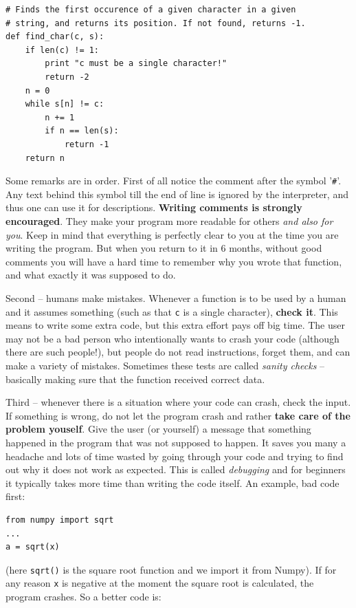 \begin{verbatim}
# Finds the first occurence of a given character in a given 
# string, and returns its position. If not found, returns -1. 
def find_char(c, s):
    if len(c) != 1: 
        print "c must be a single character!"
        return -2
    n = 0
    while s[n] != c:
        n += 1
        if n == len(s):
            return -1
    return n
\end{verbatim}
Some remarks are in order. First of all notice the comment after the 
symbol '{\tt \#}'. Any text behind this symbol till the end of line is ignored 
by the interpreter, and thus one can use it for descriptions. {\bf Writing 
comments is strongly encouraged}. They make your program more readable for others
{\em and also for you}. Keep in mind that everything is perfectly clear to you 
at the time you are writing the program. But when you return to it in 6 months, 
without good comments you will have a hard time to remember why you wrote that 
function, and what exactly it was supposed to do. 

Second -- humans make mistakes. Whenever a function is to be used by a human
and it assumes something (such as that {\tt c} is a single character), {\bf check
it}. This means to write some extra code, but this extra effort pays off big time.
The user may not be a bad person who intentionally wants to crash your 
code (although there are such people!), but people do not read instructions, 
forget them, and can make a variety 
of mistakes. Sometimes these tests are called {\em sanity checks} -- basically
making sure that the function received correct data.

Third -- whenever there is 
a situation where your code can crash, check the input. If something is wrong,
do not let the program crash and rather {\bf take care of the problem youself}. 
Give the user (or yourself) a message that something happened in the program that 
was not supposed 
to happen. It saves you many a headache and lots of time wasted by going through 
your code and trying to find out why it does not work as expected. This is called 
{\em debugging} and for beginners it typically takes more time than writing the 
code itself. An example, bad code first:

\begin{verbatim}
from numpy import sqrt
...
a = sqrt(x)
\end{verbatim}
(here {\tt sqrt()} is the square root function and we import it from Numpy). If
for any reason {\tt x} is negative at the moment the square root is calculated,
the program crashes. So a better code is:

